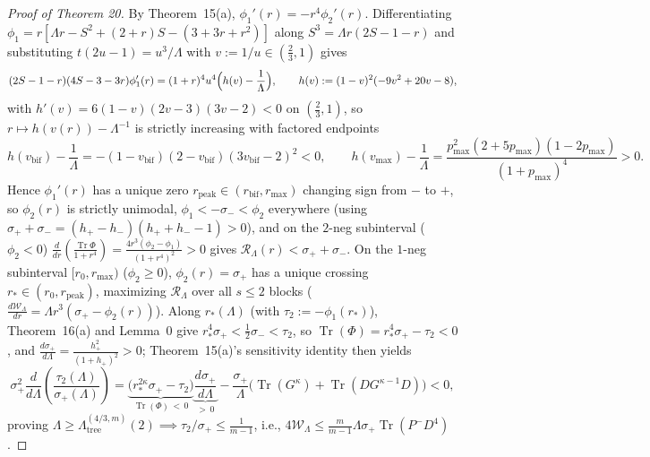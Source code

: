 \documentclass[10pt,letterpaper]{article}
\newcommand{\Tr}{\operatorname{Tr}}
\begin{document}
\begin{proof}[Proof of Theorem 20]
By Theorem~15(a), $\phi_1'(r) = -r^4\phi_2'(r)$. Differentiating $\phi_1 = r[\Lambda r - S^2 + (2+r)S - (3+3r+r^2)]$ along $S^3 = \Lambda r(2S-1-r)$ and substituting $t(2u-1) = u^3/\Lambda$ with $v := 1/u \in (\frac{2}{3}, 1)$ gives
\[
  (2S-1-r)(4S-3-3r)\phi_1'(r) = (1+r)^4 u^4\Bigl(h(v) - \frac{1}{\Lambda}\Bigr),
  \qquad h(v) := (1-v)^2(-9v^2 + 20v - 8),
\]
with $h'(v) = 6(1-v)(2v-3)(3v-2) < 0$ on $(\frac{2}{3}, 1)$, so $r \mapsto h(v(r)) - \Lambda^{-1}$ is strictly increasing with factored endpoints
\[
  h(v_{\mathrm{bif}}) - \frac{1}{\Lambda} = -(1-v_{\mathrm{bif}})(2-v_{\mathrm{bif}})(3v_{\mathrm{bif}}-2)^2 < 0,
  \qquad
  h(v_{\max}) - \frac{1}{\Lambda} = \frac{p_{\max}^2(2+5p_{\max})(1-2p_{\max})}{(1+p_{\max})^4} > 0.
\]
Hence $\phi_1'(r)$ has a unique zero $r_{\mathrm{peak}} \in (r_{\mathrm{bif}}, r_{\max})$ changing sign from $-$ to $+$, so $\phi_2(r)$ is strictly unimodal, $\phi_1 < -\sigma_- < \phi_2$ everywhere (using $\sigma_+ + \sigma_- = (h_+ - h_-)(h_+ + h_- - 1) > 0$), and on the $2$-neg subinterval ($\phi_2 < 0$) $\frac{d}{dr}(\frac{\Tr\Phi}{1+r^4}) = \frac{4r^3(\phi_2-\phi_1)}{(1+r^4)^2} > 0$ gives $\mathcal{R}_\Lambda(r) < \sigma_+ + \sigma_-$. On the $1$-neg subinterval $[r_0, r_{\max})$ ($\phi_2 \ge 0$), $\phi_2(r) = \sigma_+$ has a unique crossing $r_* \in (r_0, r_{\mathrm{peak}})$, maximizing $\mathcal{R}_\Lambda$ over all $s \le 2$ blocks ($\frac{d\mathcal{W}_\Lambda}{dr} = \Lambda r^3(\sigma_+ - \phi_2(r))$). Along $r_*(\Lambda)$ (with $\tau_2 := -\phi_1(r_*)$), Theorem~16(a) and Lemma~0 give $r_*^4\sigma_+ < \frac{1}{2}\sigma_- < \tau_2$, so $\Tr(\Phi) = r_*^4\sigma_+ - \tau_2 < 0$, and $\frac{d\sigma_+}{d\Lambda} = \frac{h_+^2}{(1+h_+)^2} > 0$; Theorem~15(a)'s sensitivity identity then yields
\begin{equation}\label{eq:ratio_mono}
  \sigma_+^2 \frac{d}{d\Lambda}\!\left(\frac{\tau_2(\Lambda)}{\sigma_+(\Lambda)}\right)
  = \underbrace{\bigl(r_*^{2\kappa}\sigma_+ - \tau_2\bigr)}_{\Tr(\Phi)\,<\,0}\underbrace{\frac{d\sigma_+}{d\Lambda}}_{>\,0}
    - \frac{\sigma_+}{\Lambda}\bigl(\Tr(G^\kappa) + \Tr(DG^{\kappa-1}D)\bigr) < 0,
\end{equation}
proving $\Lambda \ge \Lambda_{\mathrm{tree}}^{(4/3,m)}(2) \implies \tau_2/\sigma_+ \le \frac{1}{m-1}$, i.e., $4\mathcal{W}_\Lambda \le \frac{m}{m-1}\Lambda\sigma_+\Tr(P^- D^4)$.


\end{proof}
\end{document}

